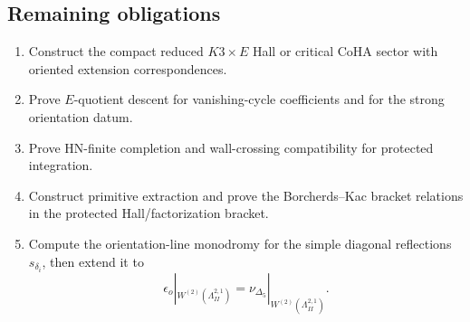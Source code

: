 \subsection{Remaining obligations}

\begin{enumerate}
\item Construct the compact reduced \(K3\times E\) Hall or critical CoHA
sector with oriented extension correspondences.
\item Prove \(E\)-quotient descent for vanishing-cycle coefficients and
for the strong orientation datum.
\item Prove HN-finite completion and wall-crossing compatibility for
protected integration.
\item Construct primitive extraction and prove the Borcherds--Kac bracket
relations in the protected Hall/factorization bracket.
\item Compute the orientation-line monodromy for the simple diagonal
reflections \(s_{\delta_i}\), then extend it to
\[
  \epsilon_o|_{W^{(2)}(\Lambda^{2,1}_{II})}
  =
  \nu_{\Delta_5}|_{W^{(2)}(\Lambda^{2,1}_{II})}.
\]
\end{enumerate}
